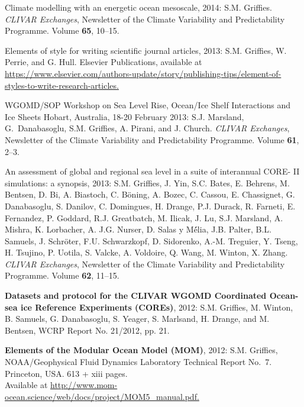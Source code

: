 \begin{etaremune}
\item Climate modelling with an energetic ocean mesoscale, 2014: S.M. Grif\/f\/ies.  {\em CLIVAR Exchanges}, Newsletter of the Climate Variability and Predictability Programme.  Volume {\bf 65}, 10--15.

\item Elements of style for writing scientific journal articles, 2013: S.M. Grif\/f\/ies, W. Perrie, and G. Hull. Elsevier Publications, available at \href{https://www.elsevier.com/authors-update/story/publishing-tips/element-of-styles-to-write-research-articles}{https://www.elsevier.com/authors-update/story/publishing-tips/element-of-styles-to-write-research-articles.}

\item WGOMD/SOP Workshop on Sea Level Rise, Ocean/Ice Shelf Interactions and Ice Sheets Hobart, Australia, 18-20 February 2013: S.J. Marsland, G.\ Danabasoglu, S.M. Grif\/f\/ies, A. Pirani, and J. Church.  {\em CLIVAR Exchanges}, Newsletter of the Climate Variability and Predictability Programme.  Volume {\bf 61}, 2--3.

\item An assessment of global and regional sea level in a suite of interannual CORE- II simulations: a synopsis, 2013:  S.M. Grif\/f\/ies, J. Yin, S.C. Bates, E. Behrens, M.  Bentsen, D. Bi, A. Biastoch, C. B\"{o}ning, A. Bozec, C. Cassou, E. Chassignet, G. Danabasoglu, S. Danilov, C. Domingues, H. Drange, P.J. Durack, R. Farneti, E. Fernandez, P. Goddard, R.J. Greatbatch, M. Ilicak, J. Lu, S.J. Marsland, A. Mishra, K. Lorbacher, A. J.G. Nurser, D. Salas y M\'{é}lia, J.B. Palter, B.L. Samuels,
  J. Schr\"{o}ter, F.U. Schwarzkopf, D. Sidorenko, A.-M. Treguier, Y. Tseng, H. Tsujino, P.  Uotila, S. Valcke, A. Voldoire, Q. Wang, M. Winton, X. Zhang. {\em CLIVAR Exchanges}, Newsletter of the Climate Variability and Predictability Programme. Volume {\bf 62},
  11--15.

\item {\bf Datasets and protocol for the CLIVAR WGOMD Coordinated Ocean-sea ice Reference Experiments (COREs)}, 2012: S.M. Grif\/f\/ies, M. Winton, B. Samuels, G. Danabasoglu, S. Yeager, S. Marlsand, H.  Drange, and M. Bentsen, WCRP Report No. 21/2012, pp. 21.

\item {\bf Elements of the Modular Ocean Model (MOM)}, 2012: S.M. Grif\/f\/ies, NOAA/Geophysical Fluid Dynamics Laboratory Technical Report No.\ 7. Princeton, USA.  613 + xiii pages. \\
  Available at 
  \href{http://www.mom-ocean.science/web/docs/project/MOM5_manual.pdf}{http://www.mom-ocean.science/web/docs/project/MOM5\_manual.pdf.}


\end{etaremune}
